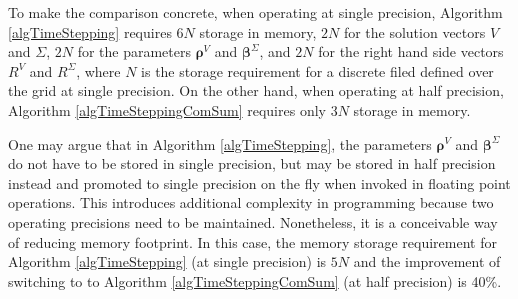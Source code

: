 \documentclass[10pt]{article}
\begin{document}
To make the comparison concrete, when operating at single precision, Algorithm \ref{algTimeStepping} requires $6N$ storage in memory, $2N$ for the solution vectors $V$ and $\Sigma$, $2N$ for the parameters $\boldsymbol \rho^V$ and $\boldsymbol \beta^\Sigma$, and $2N$ for the right hand side vectors $R^V$ and $R^\Sigma$, where $N$ is the storage requirement for a discrete filed
%
defined over the grid at single precision.
%
On the other hand, when operating at half precision, Algorithm \ref{algTimeSteppingComSum} requires only $3N$ storage in memory.


One may argue that in Algorithm \ref{algTimeStepping}, the parameters $\boldsymbol \rho^V$ and $\boldsymbol \beta^\Sigma$ do not have to be stored in single precision, but may be stored in half precision instead and promoted to single precision on the fly when invoked in floating point operations. 
%
This 
%
introduces additional complexity in programming because two operating precisions need to be maintained.
%
Nonetheless, it is a conceivable way of reducing memory footprint. 
%
In this case, the memory storage requirement for Algorithm \ref{algTimeStepping} (at single precision) is $5N$ and the improvement of switching to to Algorithm \ref{algTimeSteppingComSum} (at half precision)
%
is 40\%.
\end{document}
